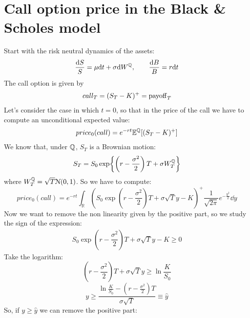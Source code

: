 \section{Call option price in the Black \& Scholes model} 
Start with the risk neutral dynamics of the assets:
\begin{equation}
    \frac{\dd S}{S} = \mu\dd t + \sigma \dd W^{\mathbb{Q}}, \qquad \frac{\dd B}{B} = r\dd t
\end{equation}
The call option is given by
\begin{equation}
    call_T = (S_T - K)^+ = \operatorname{payoff}_T
\end{equation}
Let's consider the case in which $t=0$, so that in the price of the call we have to compute an unconditional expected value:
\begin{equation}
    price_0(call) = e^{-rt}\mathbb{E}^{\mathbb{Q}}[(S_T-K)^+]
\end{equation}
We know that, under $\mathbb{Q}$, $S_T$ is a Brownian motion:
\begin{equation}
    S_T = S_0\exp{\left(r-\dfrac{\sigma^2}{2}\right)T+\sigma W_T^{\mathbb{Q}}}
\end{equation}
where $W_T^{\mathbb{Q}}=\sqrt{T}\mathcal{N}(0,1)$. So we have to compute:
\begin{equation}
    price_0(call) = e^{-rt}\int_{\mathbb{R}}\left(S_0\exp{\left(r-\dfrac{\sigma^2}{2}\right)T+\sigma \sqrt{T}y}-K\right)^+\frac{1}{\sqrt{2\pi}}e^{-\frac{y^2}{2}}\dd y
\end{equation}
Now we want to remove the non linearity given by the positive part, so we study the sign of the expression:
\begin{align}
    S_0\exp{\left(r-\dfrac{\sigma^2}{2}\right)T+\sigma \sqrt{T}y}-K \ge 0
\end{align}
Take the logarithm:
\begin{equation*}
    \left(r-\dfrac{\sigma^2}{2}\right)T+\sigma \sqrt{T}y \ge \ln\frac{K}{S_0}
\end{equation*}
\begin{equation*}
    y \ge \dfrac{\ln\frac{K}{S_0} - \left(r-\frac{\sigma^2}{2}\right)T}{\sigma\sqrt{T}} \equiv \hat{y}
\end{equation*}
So, if $y\ge\hat{y}$ we can remove the positive part:
